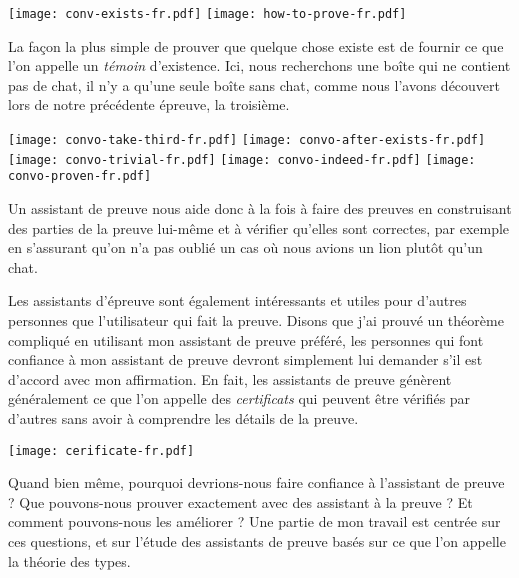\begin{center}
  \texttt{[image: conv-exists-fr.pdf]}
  \texttt{[image: how-to-prove-fr.pdf]}
\end{center}

La façon la plus simple de prouver que quelque chose existe est de fournir ce
que l'on appelle un \emph{témoin} d'existence. Ici, nous recherchons une boîte
qui ne contient pas de chat, il n'y a qu'une seule boîte sans chat, comme nous l'avons découvert lors de notre précédente épreuve, la troisième.

\begin{center}
  \texttt{[image: convo-take-third-fr.pdf]}
  \texttt{[image: convo-after-exists-fr.pdf]}
  \texttt{[image: convo-trivial-fr.pdf]}
  \texttt{[image: convo-indeed-fr.pdf]}
  \texttt{[image: convo-proven-fr.pdf]}
\end{center}

Un assistant de preuve nous aide donc à la fois à faire des preuves en
construisant des parties de la preuve lui-même et à vérifier qu'elles sont
correctes, par exemple en s'assurant qu'on n'a pas oublié un cas où nous avions
un lion plutôt qu'un chat.

Les assistants d'épreuve sont également intéressants et utiles pour d'autres
personnes que l'utilisateur qui fait la preuve. Disons que j'ai prouvé un
théorème compliqué en utilisant mon assistant de preuve préféré, les personnes
qui font confiance à mon assistant de preuve devront simplement lui demander
s'il est d'accord avec mon affirmation.
En fait, les assistants de preuve génèrent généralement ce que l'on appelle des
\emph{certificats} qui peuvent être vérifiés par d'autres sans avoir à
comprendre les détails de la preuve.

\begin{center}
  \texttt{[image: cerificate-fr.pdf]}
\end{center}

Quand bien même, pourquoi devrions-nous faire confiance à l'assistant de
preuve ? Que pouvons-nous prouver exactement avec des assistant à la preuve ?
Et comment pouvons-nous les améliorer ?
Une partie de mon travail est centrée sur ces questions, et sur l'étude des
assistants de preuve basés sur ce que l'on appelle la théorie des types.

